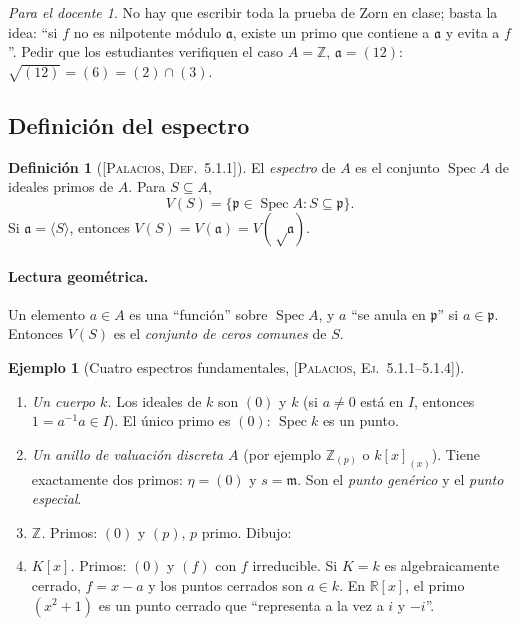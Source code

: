 \documentclass[11pt,a4paper]{article}
\newcommand{\Spec}{\operatorname{Spec}}
\newcommand{\ZZ}{\mathbb{Z}}
\newcommand{\RR}{\mathbb{R}}
\newcommand{\pp}{\mathfrak{p}}
\newcommand{\mm}{\mathfrak{m}}
\newcommand{\aaa}{\mathfrak{a}}
\theoremstyle{plain}
\theoremstyle{definition}
\newtheorem{definicion}[teorema]{Definición}
\newtheorem{ejemplo}[teorema]{Ejemplo}
\theoremstyle{remark}
\newtheorem*{docente}{Para el docente}
\newcounter{ej}
\newcommand{\libro}[1]{\textsc{[Palacios, #1]}}
\begin{document}
\begin{docente}
No hay que escribir toda la prueba de Zorn en clase; basta la idea: ``si $f$ no es nilpotente módulo $\aaa$, existe un primo que contiene a $\aaa$ y evita a $f$''. Pedir que los estudiantes verifiquen el caso $A=\ZZ$, $\aaa=(12)$: $\sqrt{(12)}=(6)=(2)\cap(3)$.
\end{docente}

\subsection{Definición del espectro}

\begin{definicion}[{\libro{Def.~5.1.1}}]
El \emph{espectro} de $A$ es el conjunto $\Spec A$ de ideales primos de $A$. Para $S\subseteq A$,
\[
V(S)=\{\pp\in\Spec A:S\subseteq\pp\}.
\]
Si $\aaa=\langle S\rangle$, entonces $V(S)=V(\aaa)=V(\sqrt\aaa)$.
\end{definicion}

\paragraph{Lectura geométrica.} Un elemento $a\in A$ es una ``función'' sobre $\Spec A$, y $a$ ``se anula en $\pp$'' si $a\in\pp$. Entonces $V(S)$ es el \emph{conjunto de ceros comunes} de $S$.

\begin{ejemplo}[{Cuatro espectros fundamentales, \libro{Ej.~5.1.1--5.1.4}}]\label{ej:cuatro}
\begin{enumerate}[label=(\alph*),itemsep=2pt]
\item \emph{Un cuerpo $k$.} Los ideales de $k$ son $(0)$ y $k$ (si $a\ne0$ está en $I$, entonces $1=a^{-1}a\in I$). El único primo es $(0)$: $\Spec k$ es un punto.
\item \emph{Un anillo de valuación discreta $A$} (por ejemplo $\ZZ_{(p)}$ o $k[x]_{(x)}$). Tiene exactamente dos primos: $\eta=(0)$ y $s=\mm$. Son el \emph{punto genérico} y el \emph{punto especial}.
\item \emph{$\ZZ$.} Primos: $(0)$ y $(p)$, $p$ primo. Dibujo:
\begin{center}
\end{center}
\item \emph{$K[x]$.} Primos: $(0)$ y $(f)$ con $f$ irreducible. Si $K=k$ es algebraicamente cerrado, $f=x-a$ y los puntos cerrados son $a\in k$. En $\RR[x]$, el primo $(x^2+1)$ es un punto cerrado que ``representa a la vez a $i$ y $-i$''.
\end{enumerate}
\end{ejemplo}
\end{document}
